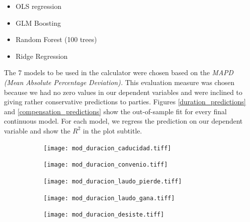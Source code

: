 \documentclass[]{article}
\begin{document}
\begin{itemize}
\item OLS regression

\item GLM Boosting

\item Random Forest (100 trees)

\item Ridge Regression
\end{itemize}

The 7 models to be used in the calculator were chosen based on the \emph{MAPD (Mean Absolute Percentage Deviation).} This evaluation
measure was chosen because we had no zero values in our dependent
variables and were inclined to giving rather conservative predictions to
parties. Figures \ref{duration_predictions} and \ref{compensation_predictions} show the out-of-sample fit for every final continuous model. For each model, we regress the prediction on our dependent variable and show the $R^2$ in the plot subtitle.

\begin{figure}[H]
    \caption{Duration predictions in the first pilot}
    \label{duration_predictions}
    \begin{center}
    \begin{subfigure}{0.49\textwidth}
    \centering
        \texttt{[image: mod\_duracion\_caducidad.tiff]}
     \end{subfigure}
     \begin{subfigure}{0.49\textwidth}
    \centering
        \texttt{[image: mod\_duracion\_convenio.tiff]}
     \end{subfigure}
     \hfill
         \begin{subfigure}{0.49\textwidth}
    \centering
        \texttt{[image: mod\_duracion\_laudo\_pierde.tiff]}
     \end{subfigure}
     \begin{subfigure}{0.49\textwidth}
    \centering
        \texttt{[image: mod\_duracion\_laudo\_gana.tiff]}
     \end{subfigure}
     \hfill
         \begin{subfigure}{0.49\textwidth}
    \centering
        \texttt{[image: mod\_duracion\_desiste.tiff]}
     \end{subfigure}
        \end{center}
\end{figure}
\end{document}
